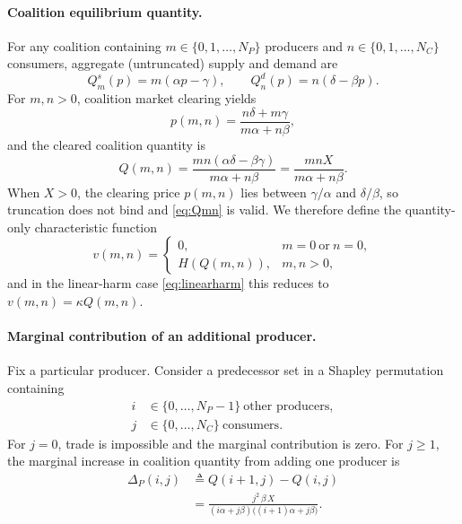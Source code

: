 \documentclass[journal, a4paper]{IEEEtran}
\begin{document}
\paragraph{Coalition equilibrium quantity.}
For any coalition containing $m\in\{0,1,\dots,N_P\}$ producers and $n\in\{0,1,\dots,N_C\}$ consumers, aggregate (untruncated) supply and demand are
\begin{equation}
Q_m^s(p)=m(\alpha p-\gamma),\qquad Q_n^d(p)=n(\delta-\beta p).
\end{equation}
For $m,n>0$, coalition market clearing yields
\begin{equation}
p(m,n)=\frac{n\delta+m\gamma}{m\alpha+n\beta},
\end{equation}
and the cleared coalition quantity is
\begin{equation}
Q(m,n)
=\frac{mn(\alpha\delta-\beta\gamma)}{m\alpha+n\beta}
=\frac{mnX}{m\alpha+n\beta}.
\label{eq:Qmn}
\end{equation}
When $X>0$, the clearing price $p(m,n)$ lies between $\gamma/\alpha$ and $\delta/\beta$, so truncation does not bind and \eqref{eq:Qmn} is valid. We therefore define the quantity-only characteristic function
\begin{equation}
v(m,n)=
\begin{cases}
0, & m=0\ \text{or}\ n=0,\\[4pt]
\displaystyle H(Q(m,n)), & m,n>0,
\end{cases}
\end{equation}
and in the linear-harm case \eqref{eq:linearharm} this reduces to $v(m,n)=\kappa Q(m,n)$.

\paragraph{Marginal contribution of an additional producer.}
Fix a particular producer. Consider a predecessor set in a Shapley permutation containing
\begin{align*}
i&\in\{0,\dots,N_P-1\}\ \text{other producers},\\
j&\in\{0,\dots,N_C\}\ \text{consumers}.
\end{align*}
For $j=0$, trade is impossible and the marginal contribution is zero. For $j\ge 1$, the marginal increase in coalition quantity from adding one producer is
\begin{align}
\Delta_P(i,j)
&\triangleq Q(i+1,j)-Q(i,j)\nonumber\\
&=\frac{j^2\,\beta\,X}{(i\alpha+j\beta)\big((i+1)\alpha+j\beta\big)}.
\label{eq:DeltaP}
\end{align}
\end{document}
